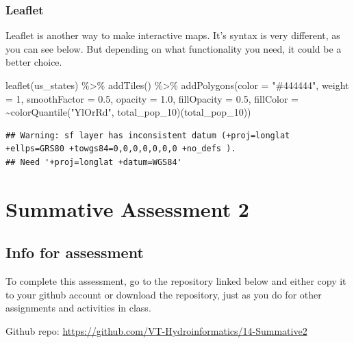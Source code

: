 \documentclass[
]{book}
\newenvironment{Shaded}{\begin{snugshade}}{\end{snugshade}}
\newcommand{\AttributeTok}[1]{\textcolor[rgb]{0.77,0.63,0.00}{#1}}
\newcommand{\DecValTok}[1]{\textcolor[rgb]{0.00,0.00,0.81}{#1}}
\newcommand{\FloatTok}[1]{\textcolor[rgb]{0.00,0.00,0.81}{#1}}
\newcommand{\FunctionTok}[1]{\textcolor[rgb]{0.00,0.00,0.00}{#1}}
\newcommand{\NormalTok}[1]{#1}
\newcommand{\SpecialCharTok}[1]{\textcolor[rgb]{0.00,0.00,0.00}{#1}}
\newcommand{\StringTok}[1]{\textcolor[rgb]{0.31,0.60,0.02}{#1}}
\begin{document}
\hypertarget{leaflet}{%
\subsection{Leaflet}\label{leaflet}}

Leaflet is another way to make interactive maps. It's syntax is very different, as you can see below. But depending on what functionality you need, it could be a better choice.

\begin{Shaded}
\begin{Highlighting}[]
\FunctionTok{leaflet}\NormalTok{(us\_states) }\SpecialCharTok{\%\textgreater{}\%} 
  \FunctionTok{addTiles}\NormalTok{() }\SpecialCharTok{\%\textgreater{}\%}
  \FunctionTok{addPolygons}\NormalTok{(}\AttributeTok{color =} \StringTok{"\#444444"}\NormalTok{, }\AttributeTok{weight =} \DecValTok{1}\NormalTok{, }\AttributeTok{smoothFactor =} \FloatTok{0.5}\NormalTok{,}
    \AttributeTok{opacity =} \FloatTok{1.0}\NormalTok{, }\AttributeTok{fillOpacity =} \FloatTok{0.5}\NormalTok{,}
    \AttributeTok{fillColor =} \SpecialCharTok{\textasciitilde{}}\FunctionTok{colorQuantile}\NormalTok{(}\StringTok{"YlOrRd"}\NormalTok{, total\_pop\_10)(total\_pop\_10))}
\end{Highlighting}
\end{Shaded}

\begin{verbatim}
## Warning: sf layer has inconsistent datum (+proj=longlat +ellps=GRS80 +towgs84=0,0,0,0,0,0,0 +no_defs ).
## Need '+proj=longlat +datum=WGS84'
\end{verbatim}

\hypertarget{summative2}{%
\chapter{Summative Assessment 2}\label{summative2}}

\hypertarget{info-for-assessment}{%
\section{Info for assessment}\label{info-for-assessment}}

To complete this assessment, go to the repository linked below and either copy it to your github account or download the repository, just as you do for other assignments and activities in class.

Github repo: \url{https://github.com/VT-Hydroinformatics/14-Summative2}
\end{document}
